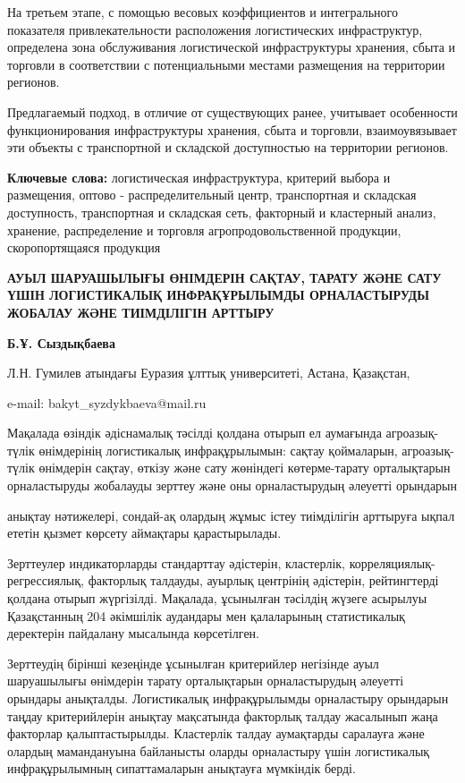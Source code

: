 На третьем этапе, с помощью весовых коэффициентов и интегрального
показателя привлекательности расположения логистических инфраструктур,
определена зона обслуживания логистической инфраструктуры хранения,
сбыта и торговли в соответствии с потенциальными местами размещения на
территории регионов.

Предлагаемый подход, в отличие от существующих ранее, учитывает
особенности функционирования инфраструктуры хранения, сбыта и торговли,
взаимоувязывает эти объекты с транспортной и складской доступностью на
территории регионов.

{\bfseries Ключевые слова:} логистическая инфраструктура, критерий выбора и
размещения, оптово - распределительный центр, транспортная и складская
доступность, транспортная и складская сеть, факторный и кластерный
анализ, хранение, распределение и торговля агропродовольственной
продукции, скоропортящаяся продукция

\begin{articleheader}
{\bfseries АУЫЛ ШАРУАШЫЛЫҒЫ ӨНІМДЕРІН САҚТАУ, ТАРАТУ ЖӘНЕ САТУ ҮШІН
ЛОГИСТИКАЛЫҚ ИНФРАҚҰРЫЛЫМДЫ ОРНАЛАСТЫРУДЫ ЖОБАЛАУ ЖӘНЕ ТИІМДІЛІГІН
АРТТЫРУ}

{\bfseries Б.Ұ. Сыздықбаева}
\end{articleheader}

\begin{affiliation}
Л.Н. Гумилев атындағы Еуразия ұлттық университеті, Астана, Қазақстан,

e-mail: bakyt\_syzdykbaeva@mail.ru
\end{affiliation}

Мақалада өзіндік әдіснамалық тәсілді қолдана отырып ел аумағында
агроазық-түлік өнімдерінің логистикалық инфрақұрылымын: сақтау
қоймаларын, агроазық-түлік өнімдерін сақтау, өткізу және сату жөніндегі
көтерме-тарату орталықтарын орналастыруды жобалауды зерттеу және оны
орналастырудың әлеуетті орындарын

анықтау нәтижелері, сондай-ақ олардың жұмыс істеу тиімділігін арттыруға
ықпал ететін қызмет көрсету аймақтары қарастырылады.

Зерттеулер индикаторларды стандарттау әдістерін, кластерлік,
корреляциялық-регрессиялық, факторлық талдауды, ауырлық центрінің
әдістерін, рейтингтерді қолдана отырып жүргізілді. Мақалада, ұсынылған
тәсілдің жүзеге асырылуы Қазақстанның 204 әкімшілік аудандары мен
қалаларының статистикалық деректерін пайдалану мысалында көрсетілген.

Зерттеудің бірінші кезеңінде ұсынылған критерийлер негізінде ауыл
шаруашылығы өнімдерін тарату орталықтарын орналастырудың әлеуетті
орындары анықталды. Логистикалық инфрақұрылымды орналастыру орындарын
таңдау критерийлерін анықтау мақсатында факторлық талдау жасалынып жаңа
факторлар қалыптастырылды. Кластерлік талдау аумақтарды саралауға және
олардың мамандануына байланысты оларды орналастыру үшін логистикалық
инфрақұрылымның сипаттамаларын анықтауға мүмкіндік берді.

